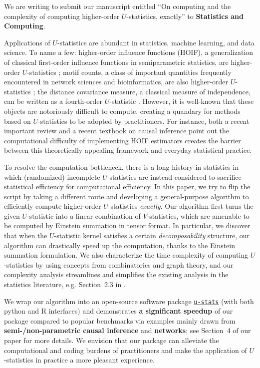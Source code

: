 \documentclass[11pt]{article}
\newcommand{\libref}[2]{\href{#2}{\texttt{#1}}}
\def\package{\libref{u-stats}{https://github.com/zrq1706/U-Statistics-python}}
\begin{document}
We are writing to submit our manuscript entitled ``On computing and the complexity of computing higher-order $U$-statistics, exactly'' to \textbf{Statistics and Computing}.

Applications of $U$-statistics are abundant in statistics, machine learning, and data science. To name a few: higher-order influence functions (HOIF), a generalization of classical first-order influence functions in semiparametric statistics, are higher-order $U$-statistics \cite{robins2017minimax}; motif counts, a class of important quantities frequently encountered in network sciences and bioinformatics, are also higher-order $U$-statistics \cite{chatterjee2024higher}; the distance covariance measure, a classical measure of independence, can be written as a fourth-order $U$-statistic \citep{shao2025u}. However, it is well-known that these objects are notoriously difficult to compute, creating a quandary for methods based on $U$-statistics to be adopted by practitioners. For instance, both a recent important review \cite{cinelli2025challenges} and a recent textbook on causal inference \cite{wager2024causal} point out the computational difficulty of implementing HOIF estimators creates the barrier between this theoretically appealing framework and everyday statistical practice.

To resolve the computation bottleneck, there is a long history in statistics in which (randomized) incomplete $U$-statistics are instead considered to sacrifice statistical efficiency for computational efficiency. In this paper, we try to flip the script by taking a different route and developing a general-purpose algorithm to efficiently compute higher-order $U$-statistics \emph{exactly}. Our algorithm first turns the given $U$-statistic into a linear combination of $V$-statistics, which are amenable to be computed by Einstein summation in tensor format. In particular, we discover that when the $U$-statistic kernel satisfies a certain \emph{decomposability} structure, our algorithm can drastically speed up the computation, thanks to the Einstein summation formulation. We also characterize the time complexity of computing $U$-statistics by using concepts from combinatorics and graph theory, and our complexity analysis streamlines and simplifies the existing analysis in the statistics literature, e.g. Section~2.3 in \cite{he2021asymptotically}.

We wrap our algorithm into an open-source software package \underline{\package{}} (with both python and R interfaces) and demonstrates \textbf{a significant speedup} of our package compared to popular benchmarks via examples mainly drawn from \textbf{semi-/non-parametric causal inference} and \textbf{networks}; see Section~4 of our paper for more details. We envision that our package can alleviate the computational and coding burdens of practitioners and make the application of $U$-statistics in practice a more pleasant experience. 
\end{document}

